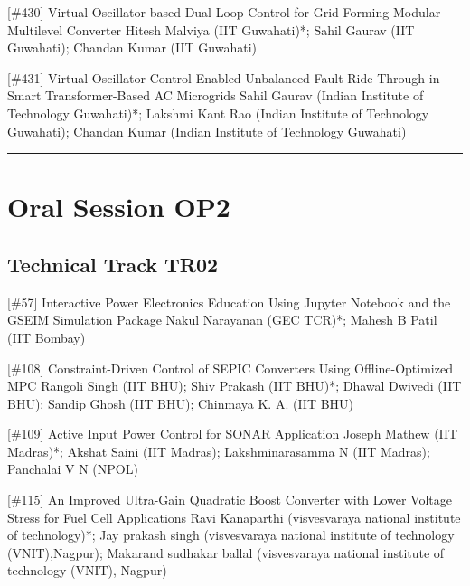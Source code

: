 {} \begin{abstract_online} {[\#430] Virtual Oscillator based Dual Loop Control for Grid Forming Modular Multilevel Converter} {} {Hitesh Malviya (IIT Guwahati)*; Sahil Gaurav (IIT Guwahati); Chandan Kumar (IIT Guwahati)} {}  \end{abstract_online} 
{} \begin{abstract_online} {[\#431] Virtual Oscillator Control-Enabled Unbalanced Fault Ride-Through in Smart Transformer-Based AC Microgrids} {} {Sahil Gaurav (Indian Institute of Technology Guwahati)*; Lakshmi Kant Rao (Indian Institute of Technology Guwahati); Chandan Kumar (Indian Institute of Technology Guwahati)} {}  \end{abstract_online} 
\hrule \section{Oral Session OP2}\nopagebreak \subsection{Technical Track TR02}\nopagebreak{} \begin{abstract_online} {[\#57] Interactive Power Electronics Education Using Jupyter Notebook and the GSEIM Simulation Package} {} {Nakul Narayanan (GEC TCR)*; Mahesh B Patil (IIT Bombay)} {}  \end{abstract_online} 
{} \begin{abstract_online} {[\#108] Constraint-Driven Control of SEPIC Converters Using Offline-Optimized MPC} {} {Rangoli Singh (IIT BHU); Shiv Prakash (IIT BHU)*; Dhawal Dwivedi (IIT BHU); Sandip Ghosh (IIT BHU); Chinmaya K. A. (IIT BHU)} {}  \end{abstract_online} 
{} \begin{abstract_online} {[\#109] Active Input Power Control for SONAR Application} {} {Joseph Mathew (IIT Madras)*; Akshat Saini (IIT Madras); Lakshminarasamma N (IIT Madras); Panchalai V N (NPOL)} {}  \end{abstract_online} 
{} \begin{abstract_online} {[\#115] An Improved Ultra-Gain Quadratic Boost Converter  with Lower Voltage Stress for Fuel Cell  Applications} {} {Ravi Kanaparthi (visvesvaraya national institute of technology)*; Jay prakash singh (visvesvaraya national institute of technology (VNIT),Nagpur); Makarand sudhakar ballal (visvesvaraya national institute of technology (VNIT), Nagpur)} {}  \end{abstract_online} 
